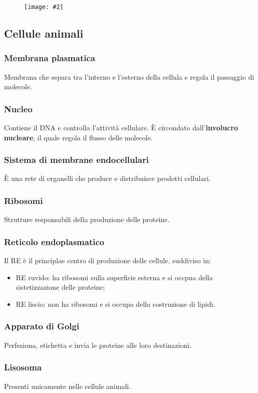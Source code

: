 \documentclass{article}
\newcommand{\cfig}[2]{
    \phantom{}
    \begin{figure}[ht!]
        \begin{center}
            \texttt{[image: \#2]}
        \end{center}
    \end{figure}
}
\begin{document}
\cfig{.6}{media/cellule.png}

\newpage
\subsection{Cellule animali}
\subsubsection{Membrana plasmatica}
Membrana che separa tra l'interno e l'esterno della cellula e regola il passaggio di molecole.

\subsubsection{Nucleo}
Contiene il DNA e controlla l'attività cellulare. È circondato dall'\textbf{involucro nucleare},
il quale regola il flusso delle molecole.

\subsubsection{Sistema di membrane endocellulari}
È una rete di organelli che produce e distribuisce prodotti cellulari.

\subsubsection{Ribosomi}
Strutture responsabili della produzione delle proteine.

\subsubsection{Reticolo endoplasmatico}
Il RE è il principlae centro di produzione delle cellule, suddiviso in:
\begin{itemize}
    \item RE ruvido: ha ribosomi sulla superficie esterna e si occpua della sistetizzazione
        delle proteine;
    \item RE liscio: non ha ribosomi e si occupa della costruzione di lipidi.
\end{itemize}

\subsubsection{Apparato di Golgi}
Perfeziona, etichetta e invia le proteine alle loro destinazioni.

\subsubsection{Lisosoma}
Presenti unicamente nelle cellule animali.
\end{document}
